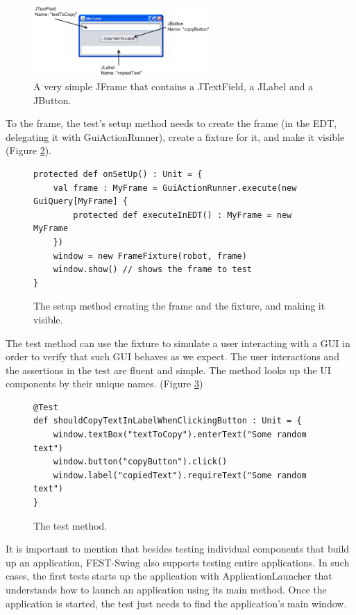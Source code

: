 \begin{figure}[h!] \label{fig:example_jframe}  
  \centering
    \includegraphics[width=0.6\textwidth]{images/example_jframe.png}
  \caption{A very simple JFrame that contains a JTextField, a JLabel and a JButton.}
\end{figure}

To the frame, the test's setup method needs to create the frame (in the EDT, delegating it with GuiActionRunner), create a fixture for it, and make it visible (Figure \ref{fig:example_setup_method}).

\begin{figure}[h!] \label{fig:example_setup_method}
\begin{lstlisting}
protected def onSetUp() : Unit = {
    val frame : MyFrame = GuiActionRunner.execute(new GuiQuery[MyFrame] {
        protected def executeInEDT() : MyFrame = new MyFrame
    })
    window = new FrameFixture(robot, frame)
    window.show() // shows the frame to test
}
\end{lstlisting}
\caption{The setup method creating the frame and the fixture, and making it visible.}
\end{figure}

The test method can use the fixture to simulate a user interacting with a GUI in order to verify that such GUI behaves as we expect. The user interactions and the assertions in the test are fluent and simple. The method looks up the UI components by their unique names. (Figure \ref{fig:example_test_method})

\begin{figure}[h!] \label{fig:example_test_method}
\begin{lstlisting}
@Test 
def shouldCopyTextInLabelWhenClickingButton : Unit = {
    window.textBox("textToCopy").enterText("Some random text")
    window.button("copyButton").click()
    window.label("copiedText").requireText("Some random text")
}
\end{lstlisting}
\caption{The test method.}
\end{figure}

It is important to mention that besides testing individual components that build up an application, FEST-Swing also supports testing entire applications. In such cases, the first tests starts up the application with ApplicationLauncher that understands how to launch an application using its main method. Once the application is started, the test just needs to find the application's main window.

